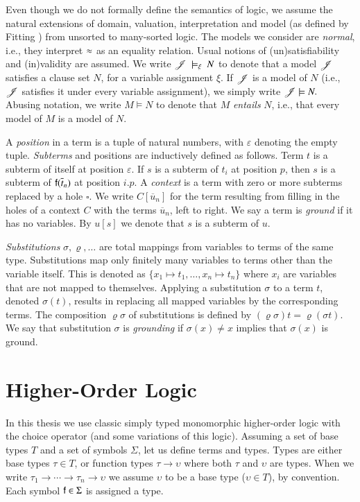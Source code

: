Even though we do not formally define the semantics of logic, we assume the natural
extensions of domain, valuation, interpretation and model (as defined by Fitting
\cite{mf-1996-fol}) from unsorted to many-sorted logic. The models we consider are
\emph{normal}, i.e., they interpret $\approx$ as an equality relation. Usual notions
of (un)satisfiability and (in)validity are assumed. We write
$\mathscr{J}~\models_\xi~N$ to denote that a model $\mathscr{J}$ satisfies a clause
set $N$, for a variable assignment $\xi$. If $\mathscr{J}$ is a model of $N$
(i.e., $\mathscr{J}$ satisfies it under every variable assignment), we simply write
$\mathscr{J} \models N.$  Abusing notation, we write $M \models N$ to denote that
$M$ \emph{entails} $N$, i.e., that every model of $M$ is a model of $N.$

A {\em position} in a term is a tuple of natural numbers, with $\varepsilon$ denoting
the empty tuple. {\em Subterms} and positions are inductively defined as follows. Term
$t$ is a subterm of itself at position $\varepsilon$. If $s$ is a subterm of
$t_i$ at position $p$, then $s$ is a subterm of $\mathsf{f}(\overline{t}_{n})$ at
position $i.p$. A {\em context} is a term with zero or more subterms replaced by a
hole $\square$. We write $C[\overline{u}_n]$ for the term resulting from filling
in the holes of a context $C$ with the terms $\overline{u}_n$, left to right.
We say a term is {\em ground} if it has no variables. By $u[s]$
we denote that $s$ is a subterm of $u$. 

{\em Substitutions} $\sigma, \varrho, \ldots$ are total mappings from variables to
terms of the same type. Substitutions map only finitely many variables to terms
other than the variable itself. This is denoted as $\{ x_1 \mapsto t_1, \ldots,
x_n \mapsto t_n \}$ where $x_i$ are variables that are not mapped to themselves.
Applying a substitution $\sigma$ to a term $t$, denoted $\sigma(t)$, results in
replacing all mapped variables by the corresponding terms.
The composition $\varrho\sigma$ of substitutions is defined by
$\left(\varrho\sigma\right)t=\varrho\left(\sigma t\right)$. We say that substitution $\sigma$ is {\em grounding}
if $\sigma(x) \not= x$ implies that $\sigma(x)$ is ground.

\section{Higher-Order Logic}
\label{sec:pre:hol}

In this thesis we use classic simply typed monomorphic higher-order logic with
the choice operator (and some variations of this logic). Assuming a set of
base types $T$ and a set of symbols $\Sigma$, let us
define terms and types. Types are either base types $\tau \in T$, or function
types $\tau \rightarrow \upsilon$ where both $\tau$ and $\upsilon$ are types.
When we write $\tau_1 \rightarrow \cdots \rightarrow \tau_n \rightarrow \upsilon$
we assume $\upsilon$ to be a base type ($\upsilon \in T$), by convention.
Each symbol $\mathsf{f} \in \Sigma$ is assigned a type.

